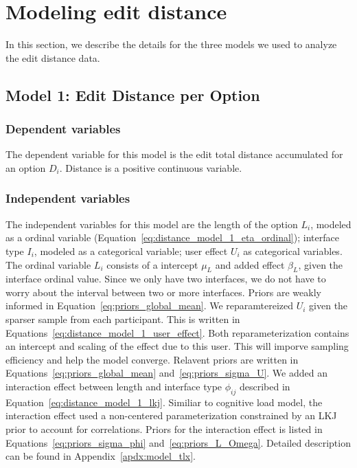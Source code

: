\section{Modeling edit distance} \label{sec:apdx:model_distance}
In this section, we describe the details for the three models we used to analyze the edit distance data.

\subsection{Model 1: Edit Distance per Option} \label{sec:apdx:model_distance_option}

\subsubsection{Dependent variables}
The dependent variable for this model is the edit total distance accumulated for an option $D_i$. Distance is a positive continuous variable.

\subsubsection{Independent variables}
The independent variables for this model are the length of the option $L_i$, modeled as a ordinal variable (Equation~\ref{eq:distance_model_1_eta_ordinal}); interface type $I_i$, modeled as a categorical variable; user effect $U_i$ as categorical variables. The ordinal variable $L_i$ consists of a intercept $\mu_L$ and added effect $\beta_L$, given the interface ordinal value. Since we only have two interfaces, we do not have to worry about the interval between two or more interfaces. Priors are weakly informed in Equation~\ref{eq:priors_global_mean}. We reparamtereized $U_i$ given the sparser sample from each participant. This is written in Equations~\ref{eq:distance_model_1_user_effect}. Both reparameterization contains an intercept and scaling of the effect due to this user. This will imporve sampling efficiency and help the model converge. Relavent priors are written in Equations~\ref{eq:priors_global_mean} and~\ref{eq:priors_sigma_U}. We added an interaction effect between length and interface type $\phi_{ij}$ described in Equation~\ref{eq:distance_model_1_lkj}. Similiar to cognitive load model, the interaction effect used a non-centered parameterization constrained by an LKJ prior to account for correlations. Priors for the interaction effect is listed in Equations~\ref{eq:priors_sigma_phi} and~\ref{eq:priors_L_Omega}. Detailed description can be found in Appendix~\ref{apdx:model_tlx}.

